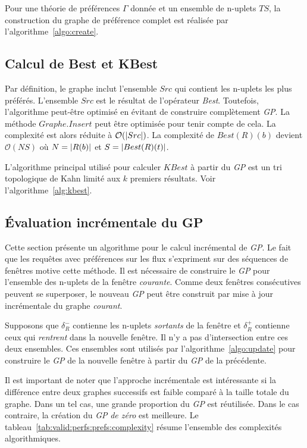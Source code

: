 Pour une théorie de préférences $\Gamma$ donnée et un ensemble de n-uplets $TS$, la construction du graphe de préférence complet est réalisée par l'algorithme~\ref{algo:create}.

\subsection{Calcul de Best et KBest}
Par définition, le graphe inclut l'ensemble $Src$ qui contient les n-uplets les plus préférés. L'ensemble $Src$ est le résultat de l'opérateur \textit{Best}. Toutefois, l'algorithme peut-être optimisé en évitant de construire complètement \textit{GP}. La méthode $Graphe.Insert$ peut être optimisée pour tenir compte de cela. 
La complexité est alors réduite à $\mathcal O(\left| Src \right|)$. La complexité de $Best(R)(b)$ devient $\mathcal O(NS)$ où $N = \left| R(b) \right|$ et $S=\left| Best(R)(t) \right|$.

L'algorithme principal utilisé pour calculer $KBest$ à partir du \textit{GP} est un tri topologique de Kahn limité aux $k$ premiers résultats. Voir l'algorithme~\ref{alg:kbest}.

\subsection{Évaluation incrémentale du GP}
Cette section présente un algorithme pour le calcul incrémental de \textit{GP}. Le fait que les requêtes avec préférences sur les flux s'expriment sur des séquences de fenêtres motive cette méthode. Il est nécessaire de construire le \textit{GP} pour l'ensemble des n-uplets de la fenêtre \textit{courante}. Comme deux fenêtres consécutives peuvent se superposer, le nouveau \textit{GP} peut être construit par mise à jour incrémentale du graphe \textit{courant}. 

Supposons que $\delta_R^{-}$ contienne les n-uplets \textit{sortants} de la fenêtre et $\delta_R^{+}$ contienne ceux qui \textit{rentrent} dans la nouvelle fenêtre. Il n'y a pas d'intersection entre ces deux ensembles. Ces ensembles sont utilisés par l'algorithme~\ref{algo:update} pour construire le \textit{GP} de la nouvelle fenêtre à partir du \textit{GP} de la précédente. 

Il est important de noter que l'approche incrémentale est intéressante si la différence entre deux graphes successifs est faible comparé à la taille totale du graphe. Dans un tel cas, une grande proportion du \textit{GP} est réutilisée. Dans le cas contraire, la création du \textit{GP} \textit{de zéro} est meilleure. Le tableau~\ref{tab:valid:perfs:prefs:complexity} résume l'ensemble des complexités algorithmiques.

